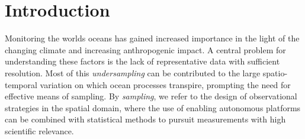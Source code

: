 \documentclass[aoas]{imsart}
\begin{document}
\begin{frontmatter}
\begin{abstract}
\end{abstract}


\begin{keyword}
\end{keyword}

\end{frontmatter}

\section{Introduction}

Monitoring the worlds oceans has gained increased importance in the light of the changing climate and increasing anthropogenic impact. A central problem for understanding these factors is the lack of representative data with sufficient resolution. Most of this \emph{undersampling} can be contributed to the large spatio-temporal variation on which ocean processes transpire, prompting the need for effective means of sampling. By \emph{sampling}, we refer to the design of observational strategies in the spatial domain, where the use of enabling autonomous platforms can be combined with statistical methods to pursuit measurements with high scientific relevance.
\end{document}
